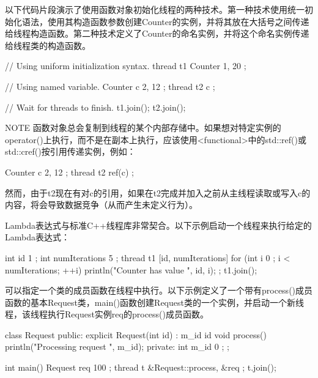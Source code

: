 以下代码片段演示了使用函数对象初始化线程的两种技术。第一种技术使用统一初始化语法，使用其构造函数参数创建Counter的实例，并将其放在大括号之间传递给线程构造函数。第二种技术定义了Counter的命名实例，并将这个命名实例传递给线程类的构造函数。

\begin{cpp}
// Using uniform initialization syntax.
thread t1 { Counter { 1, 20 } };

// Using named variable.
Counter c { 2, 12 };
thread t2 { c };

// Wait for threads to finish.
t1.join();
t2.join();
\end{cpp}

\begin{myNotic}{NOTE}
函数对象总会复制到线程的某个内部存储中。如果想对特定实例的operator()上执行，而不是在副本上执行，应该使用<functional>中的std::ref()或std::cref()按引用传递实例，例如：

\begin{cpp}
Counter c { 2, 12 };
thread t2 { ref(c) };
\end{cpp}

然而，由于t2现在有对c的引用，如果在t2完成并加入之前从主线程读取或写入c的内容，将会导致数据竞争（从而产生未定义行为）。
\end{myNotic}


Lambda表达式与标准C++线程库非常契合。以下示例启动一个线程来执行给定的Lambda表达式：

\begin{cpp}
int id { 1 };
int numIterations { 5 };
thread t1 { [id, numIterations] {
        for (int i { 0 }; i < numIterations; ++i) {
            println("Counter {} has value {}", id, i);
        }
} };
t1.join();
\end{cpp}


可以指定一个类的成员函数在线程中执行。以下示例定义了一个带有process()成员函数的基本Request类，main()函数创建Request类的一个实例，并启动一个新线程，该线程执行Request实例req的process()成员函数。

\begin{cpp}
class Request
{
    public:
        explicit Request(int id) : m_id { id } { }
        void process() { println("Processing request {}", m_id); }
    private:
        int m_id { 0 };
};

int main()
{
    Request req { 100 };
    thread t { &Request::process, &req };
    t.join();
}
\end{cpp}

